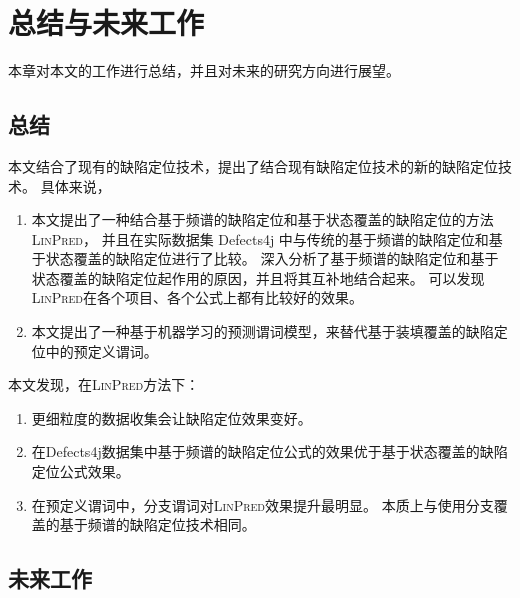 \chapter{总结与未来工作}

本章对本文的工作进行总结，并且对未来的研究方向进行展望。

\section{总结}

本文结合了现有的缺陷定位技术，提出了结合现有缺陷定位技术的新的缺陷定位技术。
具体来说，
\begin{enumerate}
\item 本文提出了一种结合基于频谱的缺陷定位和基于状态覆盖的缺陷定位的方法\textsc{LinPred}，
并且在实际数据集 Defects4j 中与传统的基于频谱的缺陷定位和基于状态覆盖的缺陷定位进行了比较。
深入分析了基于频谱的缺陷定位和基于状态覆盖的缺陷定位起作用的原因，并且将其互补地结合起来。
可以发现\textsc{LinPred}在各个项目、各个公式上都有比较好的效果。
\item 本文提出了一种基于机器学习的预测谓词模型，来替代基于装填覆盖的缺陷定位中的预定义谓词。 
\end{enumerate}

本文发现，在\textsc{LinPred}方法下：
\begin{enumerate}
\item 更细粒度的数据收集会让缺陷定位效果变好。
\item 在Defects4j数据集中基于频谱的缺陷定位公式的效果优于基于状态覆盖的缺陷定位公式效果。
\item 在预定义谓词中，分支谓词对\textsc{LinPred}效果提升最明显。
本质上与使用分支覆盖的基于频谱的缺陷定位技术相同。
\end{enumerate}

\section{未来工作}


